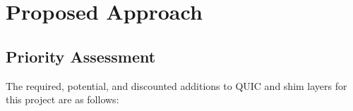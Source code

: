 \documentclass{mprop}
\begin{document}
\newpage

\section{Proposed Approach}


\subsection{Priority Assessment}

The required, potential, and discounted additions to QUIC and shim layers for this project are as follows:
\end{document}

